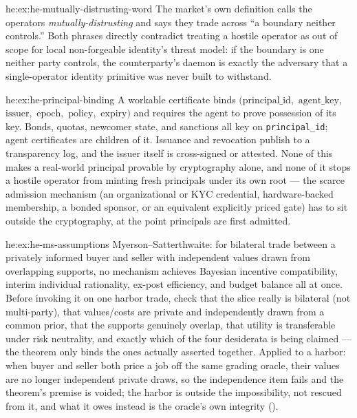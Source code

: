 \begin{pdSolution}{he:ex:he-mutually-distrusting-word}
The market's own definition calls the operators \emph{mutually-distrusting}
and says they trade across ``a boundary neither controls.'' Both phrases
directly contradict treating a hostile operator as out of scope for local
non-forgeable identity's threat model: if the boundary is one neither party
controls, the counterparty's daemon is exactly the adversary that a
single-operator identity primitive was never built to withstand.
\end{pdSolution}
\begin{pdSolution}{he:ex:he-principal-binding}
A workable certificate binds $(\text{principal\_id},$ $\text{agent\_key},$
$\text{issuer},$ $\text{epoch},$ $\text{policy},$ $\text{expiry})$ and requires the
agent to prove possession of its key. Bonds, quotas, newcomer state, and
sanctions all key on \texttt{principal\_id}; agent certificates are children of
it. Issuance and revocation publish to a transparency log, and the issuer itself
is cross-signed or attested. None of this makes a real-world principal provable
by cryptography alone, and none of it stops a hostile operator from minting
fresh principals under its own root --- the scarce admission mechanism (an
organizational or KYC credential, hardware-backed membership, a bonded sponsor,
or an equivalent explicitly priced gate) has to sit outside the cryptography, at
the point principals are first admitted.
\end{pdSolution}
\begin{pdSolution}{he:ex:he-ms-assumptions}
Myerson--Satterthwaite: for bilateral trade between a privately informed
buyer and seller with independent values drawn from overlapping supports, no
mechanism achieves Bayesian incentive compatibility, interim individual
rationality, ex-post efficiency, and budget balance all at once. Before invoking
it on one harbor trade, check that the slice really is bilateral (not
multi-party), that values/costs are private and independently drawn from a
common prior, that the supports genuinely overlap, that utility is transferable
under risk neutrality, and exactly which of the four desiderata is being
claimed --- the theorem only binds the ones actually asserted together. Applied
to a harbor: when buyer and seller both price a job off the same grading oracle,
their values are no longer independent private draws, so the independence item
fails and the theorem's premise is voided; the harbor is outside the
impossibility, not rescued from it, and what it owes instead is the oracle's own
integrity ().
\end{pdSolution}
